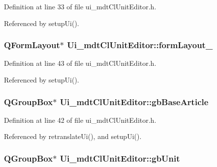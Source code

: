 Definition at line 33 of file ui\-\_\-mdt\-Cl\-Unit\-Editor.\-h.



Referenced by setup\-Ui().

\hypertarget{class_ui__mdt_cl_unit_editor_a74239d65bfa0a348343c25a5cbef2025}{
\subsubsection[{form\-Layout\-\_\-2}]{\setlength{\rightskip}{0pt plus 5cm}Q\-Form\-Layout$\ast$ Ui\-\_\-mdt\-Cl\-Unit\-Editor\-::form\-Layout\-\_}}\label{class_ui__mdt_cl_unit_editor_a74239d65bfa0a348343c25a5cbef2025}


Definition at line 43 of file ui\-\_\-mdt\-Cl\-Unit\-Editor.\-h.



Referenced by setup\-Ui().

\hypertarget{class_ui__mdt_cl_unit_editor_a0f161cab92cc14b342d66f7b7a80baa9}{
\subsubsection[{gb\-Base\-Article}]{\setlength{\rightskip}{0pt plus 5cm}Q\-Group\-Box$\ast$ Ui\-\_\-mdt\-Cl\-Unit\-Editor\-::gb\-Base\-Article}}\label{class_ui__mdt_cl_unit_editor_a0f161cab92cc14b342d66f7b7a80baa9}


Definition at line 42 of file ui\-\_\-mdt\-Cl\-Unit\-Editor.\-h.



Referenced by retranslate\-Ui(), and setup\-Ui().

\hypertarget{class_ui__mdt_cl_unit_editor_a70bdfeaf51297b4d0325dd021591351d}{
\subsubsection[{gb\-Unit}]{\setlength{\rightskip}{0pt plus 5cm}Q\-Group\-Box$\ast$ Ui\-\_\-mdt\-Cl\-Unit\-Editor\-::gb\-Unit}}\label{class_ui__mdt_cl_unit_editor_a70bdfeaf51297b4d0325dd021591351d}


